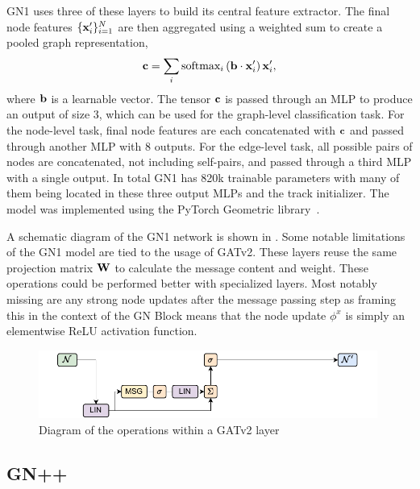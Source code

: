 GN1 uses three of these layers to build its central feature extractor.
The final node features $\{\mathbf{x}_i'\}_{i=1}^{N}$ are then aggregated using a weighted sum to create a pooled graph representation,
\begin{equation}
    \mathbf{c} = \sum_{i} \text{softmax}_i\left(\mathbf{b} \cdot \mathbf{x}_i'\right) \mathbf{x}_i',
\end{equation}
where $\mathbf{b}$ is a learnable vector.
The tensor $\mathbf{c}$ is passed through an MLP to produce an output of size 3, which can be used for the graph-level classification task.
For the node-level task, final node features are each concatenated with $\mathbf{c}$ and passed through another MLP with 8 outputs.
For the edge-level task, all possible pairs of nodes are concatenated, not including self-pairs, and passed through a third MLP with a single output.
In total GN1 has 820k trainable parameters with many of them being located in these three output MLPs and the track initializer.
The model was implemented using the PyTorch Geometric library~\cite{PYG}.

A schematic diagram of the GN1 network is shown in .
Some notable limitations of the GN1 model are tied to the usage of GATv2.
These layers reuse the same projection matrix $\mathbf{W}$ to calculate the message content and weight.
These operations could be performed better with specialized layers.
Most notably missing are any strong node updates after the message passing step as framing this in the context of the GN Block means that the node update $\phi^x$ is simply an elementwise ReLU activation function.

\begin{figure}
    \centering
    \includegraphics[width=0.99\textwidth]{figures/flavour_tagging/gn1.pdf}
    \caption{Diagram of the operations within a GATv2 layer~\cite{GATv2}}
    \label{fig:gn1_graph}
\end{figure}

\subsection{GN++}
\label{sec:gnpp}

